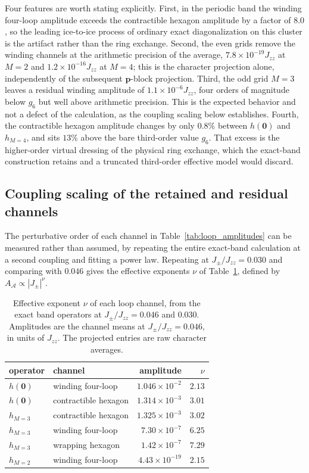\documentclass[aps,prl,onecolumn,amsmath,amssymb]{revtex4-2}
\newcommand{\Jzz}{J_{zz}}
\newcommand{\Jpm}{J_{\pm}}
\begin{document}
Four features are worth stating explicitly.  First, in the periodic band the
winding four-loop amplitude exceeds the contractible hexagon amplitude by a
factor of $8.0$, so the leading ice-to-ice process of ordinary exact
diagonalization on this cluster is the artifact rather than the ring
exchange.  Second, the even grids remove the winding channels at the
arithmetic precision of the average, $7.8\times10^{-19}\Jzz$ at $M=2$ and
$1.2\times10^{-16}\Jzz$ at $M=4$; this is the character projection alone,
independently of the subsequent $\bm p$-block projection.  Third, the odd grid
$M=3$ leaves a residual winding amplitude of $1.1\times10^{-6}\Jzz$, four
orders of magnitude below $g_6$ but well above arithmetic precision.  This is
the expected behavior and not a defect of the calculation, as the coupling
scaling below establishes.  Fourth, the contractible hexagon amplitude changes
by only $0.8\%$ between $h(\bm0)$ and $h_{M=4}$, and sits $13\%$ above the
bare third-order value $g_6$.  That excess is the higher-order virtual
dressing of the physical ring exchange, which the exact-band construction
retains and a truncated third-order effective model would discard.

\subsection{Coupling scaling of the retained and residual channels}

The perturbative order of each channel in Table~\ref{tab:loop_amplitudes} can
be measured rather than assumed, by repeating the entire exact-band
calculation at a second coupling and fitting a power law.  Repeating at
$\Jpm/\Jzz=0.030$ and comparing with $0.046$ gives the effective exponents
$\nu$ of Table~\ref{tab:loop_scaling}, defined by
$A_{\mathcal A}\propto\left|\Jpm\right|^{\nu}$.
\begin{table}[htbp]
\caption{Effective exponent $\nu$ of each loop channel, from the exact band
operators at $\Jpm/\Jzz=0.046$ and $0.030$.  Amplitudes are the channel means
at $\Jpm/\Jzz=0.046$, in units of $\Jzz$.  The projected entries are raw
character averages.}
\label{tab:loop_scaling}
\centering
\begin{tabular}{llrr}
\toprule
operator & channel & amplitude & $\nu$\\
\midrule
$h(\bm0)$ & winding four-loop & $1.046\times10^{-2}$ & $2.13$\\
$h(\bm0)$ & contractible hexagon & $1.314\times10^{-3}$ & $3.01$\\
$h_{M=3}$ & contractible hexagon & $1.325\times10^{-3}$ & $3.02$\\
$h_{M=3}$ & winding four-loop & $7.30\times10^{-7}$ & $6.25$\\
$h_{M=3}$ & wrapping hexagon & $1.42\times10^{-7}$ & $7.29$\\
$h_{M=2}$ & winding four-loop & $4.43\times10^{-19}$ & $2.15$\\
\bottomrule
\end{tabular}
\end{table}
\end{document}
